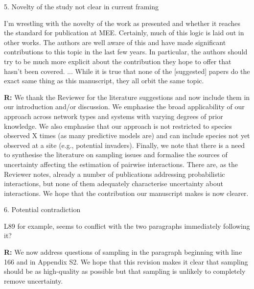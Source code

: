 \documentclass[12pt]{letter}
\newenvironment{refquote}{\bigskip \begin{it}}{\end{it}\smallskip}
\begin{document}
	5. Novelty of the study not clear in current framing


		\begin{refquote}
		I'm wrestling with the novelty of the work as presented and whether it reaches the standard for publication at MEE. Certainly, much of this logic is laid out in other works. The authors are well aware of this and have made significant contributions to this topic in the last few years. In particular, the authors should try to be much more explicit about the contribution they hope to offer that hasn't been covered. ...
		While it is true that none of the [suggested] papers do the exact same thing as this manuscript, they all	orbit the same topic. 
		\end{refquote}


		\textbf{R:} We thank the Reviewer for the literature suggestions and now include them in our introduction and/or discussion. We emphasise the broad applicability of our approach across network types and systems with varying degrees of prior knowledge. We also emphasise that our approach is not restricted to species observed X times (as many predictive models are) and can include species not yet observed at a site (e.g., potential invaders). Finally, we note that there is a need to synthesise the literature on sampling issues and formalise the sources of uncertainty affecting the estimation of pairwise interactions. There are, as the Reviewer notes, already a number of publications addressing probabilistic interactions, but none of them adequately characterise uncertainty about interactions. We hope that the contribution our manuscript makes is now clearer.


	6. Potential contradiction 
 

		\begin{refquote}
		L89 for example, seems to conflict with the two paragraphs immediately following it?
		\end{refquote}


		\textbf{R:} We now address questions of sampling in the paragraph beginning with line 166 and in Appendix S2. We hope that this revision makes it clear that sampling should be as high-quality as possible but that sampling is unlikely to completely remove uncertainty.
\end{document}
